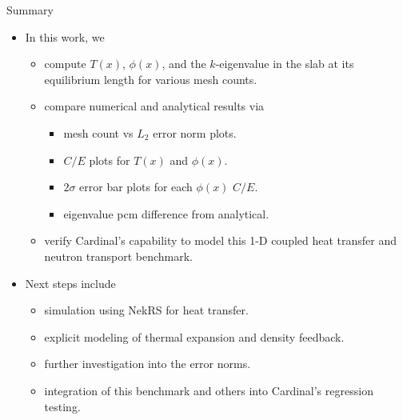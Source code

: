 \documentclass[9pt,t,aspectratio=169]{beamer}
\begin{document}
\begin{frame}{Summary}
    \pause
    \begin{itemize}
        \item <2-> In this work, we
        \begin{itemize}
            \item <3-> compute $T(x)$, $\phi(x)$, and the $k$-eigenvalue in the slab at its equilibrium length for various mesh counts.
            \item <4-> compare numerical and analytical results via
            \begin{itemize}
                \item <5-> mesh count vs $L_{2}$ error norm plots.
                \item <6-> $C/E$ plots for $T(x)$ and $\phi(x)$.
                \item <7-> $2\sigma$ error bar plots for each $\phi(x)$ $C/E$.
                \item <8-> eigenvalue pcm difference from analytical.
            \end{itemize}
            \item <9-> verify Cardinal's capability to model this 1-D coupled heat transfer and neutron transport benchmark.
        \end{itemize}
        \item <10-> Next steps include
        \begin{itemize}
            \item <11-> simulation using NekRS for heat transfer.
            \item <12-> explicit modeling of thermal expansion and density feedback.
            \item <13-> further investigation into the error norms.
            \item <14-> integration of this benchmark and others \cite{aya2023} into Cardinal's regression testing.
        \end{itemize}
    \end{itemize}
\end{frame}

\end{document}
